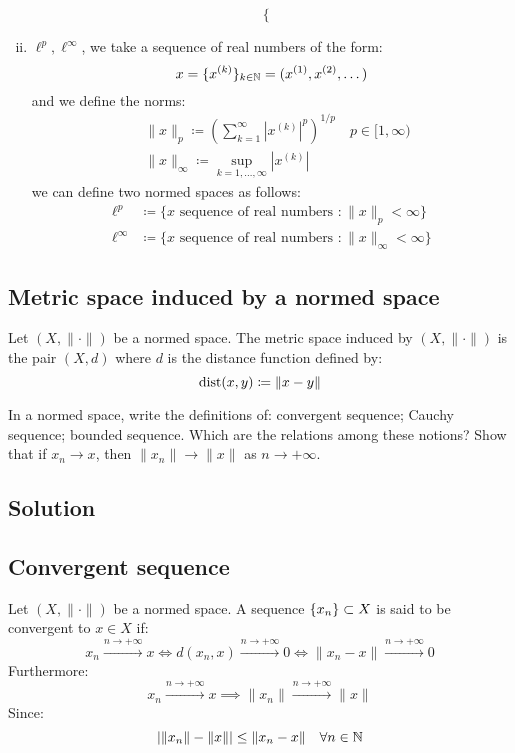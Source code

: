 \begin{enumerate}[i)]
\begin{equation*}
\begin{cases}
            \end{cases}
        \end{equation*}
    \item $\ell^p, \ell^\infty$, we take a sequence of real numbers of the form:
        \[ x = \{ x^{(k)} \}_{k\in\mathbb{N}} = (x^{(1)}, x^{(2)}, \dots) \]
        and we define the norms:
        \begin{align*}
            & \|x\|_p \coloneqq \left( \sum_{k=1}^\infty |x^{(k)}|^p \right)^{1/p} \quad p \in [1,\infty) \\
            & \|x\|_\infty \coloneqq \sup_{k=1,\dots,\infty} |x^{(k)}|
        \end{align*}
        we can define two normed spaces as follows:
        \begin{align*}
            \ell^p & \coloneqq \{x \text{ sequence of real numbers }: \|x\|_p < \infty\} \\
            \ell^\infty & \coloneqq \{x \text{ sequence of real numbers }: \|x\|_\infty < \infty\}
        \end{align*}
\end{enumerate}

\subsection{Metric space induced by a normed space}
Let $(X, \| \cdot \|)$ be a normed space. The metric space induced by $(X, \| \cdot \|)$ is the pair $(X, d)$ where $d$ is the distance function defined by:
\[ \operatorname*{dist}(x,y) \coloneqq \|x-y\| \]


\question
In a normed space, write the definitions of: convergent sequence; Cauchy sequence; bounded sequence. Which are the relations among these notions? Show that if $x_n \to x$, then $\| x_n \| \to \|x\|$ as $n \to +\infty$.

\subsection*{Solution}

\subsection{Convergent sequence}
Let $(X, \| \cdot \|)$ be a normed space. A sequence $\{ x_n \} \subset X$ is said to be convergent to $x \in X$ if:
\[ x_n \xrightarrow{n \to +\infty} x \iff d(x_n, x) \xrightarrow{n \to +\infty} 0 \iff \|x_n - x\| \xrightarrow{n \to +\infty} 0 \]
Furthermore:
\[ x_n \xrightarrow{n \to +\infty} x \implies \|x_n\| \xrightarrow{n \to +\infty} \|x\| \]
Since:
\[ | \|x_n\| - \|x\| | \leq \|x_n - x\| \quad \forall n \in \mathbb{N} \]

